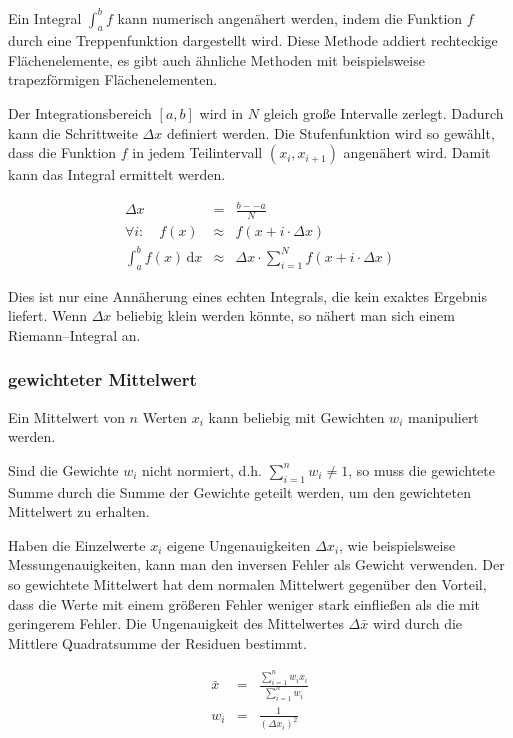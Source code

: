 \documentclass[12pt,a4paper]{scrartcl}
\numberwithin{equation}{section} %
\begin{document}
Ein Integral $\int_a^b f$ kann numerisch angenähert werden, indem die Funktion $f$ durch eine Treppenfunktion dargestellt wird. Diese Methode addiert rechteckige Flächenelemente, es gibt auch ähnliche Methoden mit beispielsweise trapezförmigen Flächenelementen.

Der Integrationsbereich $[a,b]$ wird in $N$ gleich große Intervalle zerlegt. Dadurch kann die Schrittweite $\Delta x$ definiert werden. Die Stufenfunktion wird so gewählt, dass die Funktion $f$ in jedem Teilintervall $(x_i, x_{i+1})$ angenähert wird. Damit kann das Integral ermittelt werden.

\begin{eqnarray}
    \Delta x &=& \frac{b--a}{N} \\
    \forall i:\quad
        f(x) &\approx& f(x+i\cdot\Delta x) \\
    \int_a^b f(x) \,\mathrm dx
        &\approx& \Delta x\cdot
            \sum_{i=1}^N f(x + i\cdot \Delta x)
\end{eqnarray}

\noindent
Dies ist nur eine Annäherung eines echten Integrals, die kein exaktes Ergebnis liefert. Wenn $\Delta x$ beliebig klein werden könnte, so nähert man sich einem Riemann--Integral an.

\hypertarget{gewichteter-mittelwert}{%
\subsubsection{gewichteter Mittelwert}\label{gewichteter-mittelwert}}

Ein Mittelwert von $n$ Werten $x_i$ kann beliebig mit Gewichten $w_i$ manipuliert werden.

Sind die Gewichte $w_i$ nicht normiert, d.h. $\sum_{i=1}^n w_i\neq 1$, so muss die gewichtete Summe durch die Summe der Gewichte geteilt werden, um den gewichteten Mittelwert zu erhalten.

Haben die Einzelwerte $x_i$ eigene Ungenauigkeiten $\Delta x_i$, wie beispielsweise Messungenauigkeiten, kann man den inversen Fehler als Gewicht verwenden. Der so gewichtete Mittelwert hat dem normalen Mittelwert gegenüber den Vorteil, dass die Werte mit einem größeren Fehler weniger stark einfließen als die mit geringerem Fehler. Die Ungenauigkeit des Mittelwertes $\Delta \bar x$ wird durch die Mittlere Quadratsumme der Residuen bestimmt.

\begin{eqnarray}
    \bar{x} &=&
        \frac{\sum_{i=1}^n w_i x_i}{\sum_{i=1}^n w_i}\\
    w_i &=& \frac{1}{(\Delta x_i)^2}
\end{eqnarray}
\end{document}
